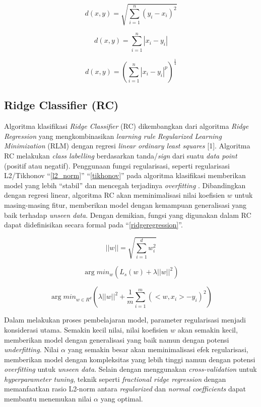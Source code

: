 \documentclass[conference]{IEEEtran}
\begin{document}
\begin{equation}
    d(x, y)=\sqrt{\sum_{i=1}^{n} (y_i - x_i)^2} \label{euclidean}
\end{equation}

\begin{equation}
    d(x,y) = \sum_{i=1}^{n}|x_i - y_i| \label{manhattan}
\end{equation}

\begin{equation}
    d(x, y) = (\sum_{i=1}^{n} |x_i - y_i|^p)^{\frac{1}{4}} \label{minkowski}
\end{equation}

\subsection{Ridge Classifier (RC)}

Algoritma klasifikasi \textit{Ridge Classifier} (RC) dikembangkan dari algoritma \textit{Ridge Regression} yang mengkombinasikan 
\textit{learning rule} \textit{Regularized Learning Minimization} (RLM) dengan regresi \textit{linear ordinary least squares} [1]. 
Algoritma RC melakukan \textit{class labelling} berdasarkan tanda/\textit{sign} dari suatu \textit{data point} (positif atau negatif). 
Penggunaan fungsi regularisasi, seperti regularisasi L2/Tikhonov ``\eqref{l2_norm}'' ``\eqref{tikhonov}'' pada algoritma klasifikasi memberikan model yang lebih “stabil” 
dan mencegah terjadinya \textit{overfitting} \cite{b4, b5}. Dibandingkan dengan regresi linear, algoritma RC akan meminimalisasi nilai 
koefisien $w$ untuk masing-masing fitur, memberikan model dengan kemampuan generalisasi yang baik terhadap \textit{unseen data}. Dengan demikian, fungsi
yang digunakan dalam RC dapat didefinisikan secara formal pada ``\eqref{ridgeregression}''.

\begin{equation}
    ||w|| = \sqrt{\sum_{i=1}^{d} w_i^2} \label{l2_norm}
\end{equation}

\begin{equation}
    \arg min _{w}(L_s(w) + \lambda ||w||^2) \label{tikhonov}
\end{equation}

\begin{equation}
    \arg min_{w \in R^d} (\lambda||w||^2 + \frac{1}{m}\sum_{i=1}^{m}(<w, x_i> - y_i)^2) \label{ridgeregression}
\end{equation}

Dalam melakukan proses pembelajaran model, parameter regularisasi menjadi konsiderasi utama. Semakin kecil nilai, nilai 
koefisien $w$ akan semakin kecil, memberikan model dengan generalisasi yang baik namun dengan potensi \textit{underfitting}. 
Nilai $\alpha$ yang semakin besar akan meminimalisasi efek regularisasi, memberikan model dengan kompleksitas yang lebih tinggi 
namun dengan potensi \textit{overfitting} untuk \textit{unseen data}. Selain dengan menggunakan \textit{cross-validation} untuk \textit{hyperparameter tuning}, teknik seperti 
\textit{fractional ridge regression} \cite{b13} dengan memanfaatkan rasio L2-norm antara \textit{regularized} dan \textit{normal coefficients} dapat membantu menemukan 
nilai $\alpha$ yang optimal.
\end{document}
